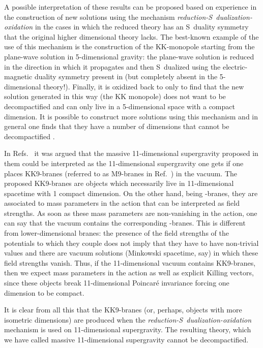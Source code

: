 \documentclass[12pt,a4paper]{article}
\begin{document}
A possible interpretation of these results can be proposed based on
experience in the construction of new solutions using the mechanism
{\it reduction-S~dualization-oxidation} in the cases in which the
reduced theory has an S~duality symmetry that the original higher
dimensional theory lacks. The best-known example of the use of this
mechanism is the construction of the KK-monopole \cite{kn:So,kn:GrPe}
starting from the plane-wave solution in 5-dimensional gravity: the
plane-wave solution is reduced in the direction in which it propagates
and then S~dualized using the electric-magnetic duality symmetry
present in \coordHE{} (but completely absent in the 5-dimensional theory!).
Finally, it is oxidized back to \coordHE{} only to find that the new
solution generated in this way (the KK monopole) does not want to be
decompactified and can only live in a 5-dimensional space with a
compact dimension. It is possible to construct more solutions using
this mechanism and in general one finds that they have a number of
dimensions that cannot be decompactified \cite{kn:L-TO2}.

In Refs.~\cite{kn:BLO,kn:MO} it was argued that the massive
11-dimensional supergravity proposed in them could be interpreted as
the 11-dimensional supergravity one gets if one places KK9-branes
(referred to as M9-branes in Ref.~\cite{kn:BvdS}) in the vacuum. The
proposed KK9-branes are objects which necessarily live in
11-dimensional spacetime with 1 compact dimension.  On the other hand,
being \coordHE{}-branes, they are associated to mass parameters in the
action that can be interpreted as field strengths. As soon as these
mass parameters are non-vanishing in the action, one can say that the
vacuum contains the corresponding \coordHE{}-branes. This is different
from lower-dimensional branes: the presence of the field strengths of
the potentials to which they couple does not imply that they have to
have non-trivial values and there are vacuum solutions (Minkowski
spacetime, say) in which these field strengths vanish. Thus, if the
11-dimensional vacuum contains KK9-branes, then we expect mass
parameters in the action as well as explicit Killing vectors, since
these objects break 11-dimensional Poincar\'e invariance forcing one
dimension to be compact.

It is clear from all this that the KK9-branes (or, perhaps, objects
with more isometric dimensions) are produced when the {\it
  reduction-S~dualization-oxidation} mechanism is used on
11-dimensional supergravity. The resulting theory, which we have called
massive 11-dimensional supergravity cannot be decompactified.
\end{document}
